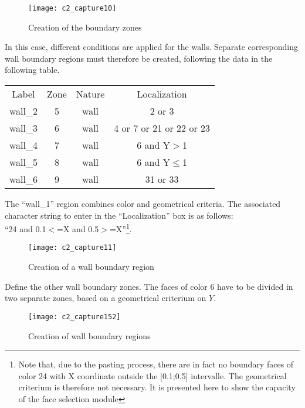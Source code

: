 \begin{figure}[h!]
\begin{center}
\texttt{[image: c2\_capture10]}
\caption{Creation of the boundary zones}
\label{fig10_e2}
\end{center}
\end{figure}


\newpage
In this case, different conditions are applied for the walls. Separate
corresponding wall boundary regions must therefore be created, following the
data in the following table.

\begin{center}
\begin{tabular}{cccc}
Label & Zone & Nature & Localization \\
wall\_2 & 5 & wall & 2 or 3 \\
wall\_3 & 6 & wall & 4 or 7 or 21 or 22 or 23 \\
wall\_4 & 7 & wall & 6 and Y$>$1 \\
wall\_5 & 8 & wall & 6 and Y$\leqslant$1 \\
wall\_6 & 9 & wall & 31 or 33 \\
\end{tabular}
\end{center}

The ``wall\_1'' region combines color and geometrical criteria. The associated
character string to enter in the ``Localization'' box is as follows:\\
``24 and 0.1$<$=X and 0.5$>$=X''\footnote{Note that, due to the pasting process,
there are in fact no boundary faces of color 24 with X coordinate outside the
[0.1;0.5] intervalle. The geometrical criterium is therefore not
necessary. It is presented here to show the capacity of the face selection
module}.

\begin{figure}[h!]
\begin{center}
\texttt{[image: c2\_capture11]}
\caption{Creation of a wall boundary region}
\label{fig11_e2}
\end{center}
\end{figure}


\newpage
Define the other wall boundary zones. The faces of color 6 have to be divided in
two separate zones, based on a geometrical criterium on $Y$.

\begin{figure}[h!]
\begin{center}
\texttt{[image: c2\_capture152]}
\caption{Creation of wall boundary regions}
\label{fig152_e2}
\end{center}
\end{figure}


